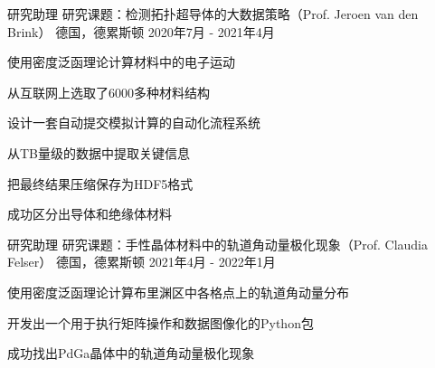 \begin{cventries}
  \cventry
    {研究助理} %
    {研究课题：检测拓扑超导体的大数据策略（Prof. Jeroen van den Brink）} %
    {德国，德累斯顿} %
    {2020年7月 - 2021年4月} %
    {
      \begin{cvitems} %
        \item {使用密度泛函理论计算材料中的电子运动}
        \item {从互联网上选取了6000多种材料结构}
        \item {设计一套自动提交模拟计算的自动化流程系统}
        \item {从TB量级的数据中提取关键信息}
        \item {把最终结果压缩保存为HDF5格式}
        \item {成功区分出导体和绝缘体材料}
      \end{cvitems}
    }
    
  \cventry
    {研究助理} %
    {研究课题：手性晶体材料中的轨道角动量极化现象（Prof. Claudia Felser）} %
    {德国，德累斯顿} %
    {2021年4月 - 2022年1月} %
    {
      \begin{cvitems}
        \item {使用密度泛函理论计算布里渊区中各格点上的轨道角动量分布}
        \item {开发出一个用于执行矩阵操作和数据图像化的Python包}
        \item {成功找出PdGa晶体中的轨道角动量极化现象}
      \end{cvitems}
    }
    

\end{cventries}
